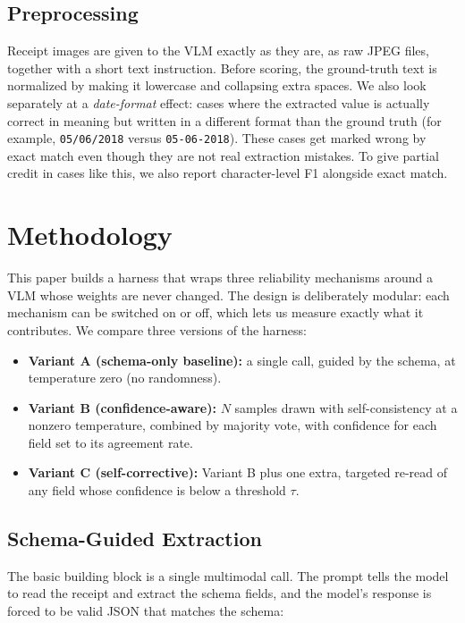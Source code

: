 \documentclass[conference]{IEEEtran}
\begin{document}
\subsection{Preprocessing}
Receipt images are given to the VLM exactly as they are, as raw JPEG files, together with a short text instruction. Before scoring, the ground-truth text is normalized by making it lowercase and collapsing extra spaces. We also look separately at a \emph{date-format} effect: cases where the extracted value is actually correct in meaning but written in a different format than the ground truth (for example, \texttt{05/06/2018} versus \texttt{05-06-2018}). These cases get marked wrong by exact match even though they are not real extraction mistakes. To give partial credit in cases like this, we also report character-level F1 alongside exact match.

\section{Methodology}
\label{sec:method}

This paper builds a harness that wraps three reliability mechanisms around a VLM whose weights are never changed. The design is deliberately modular: each mechanism can be switched on or off, which lets us measure exactly what it contributes. We compare three versions of the harness:

\begin{itemize}
    \item \textbf{Variant A (schema-only baseline):} a single call, guided by the schema, at temperature zero (no randomness).
    \item \textbf{Variant B (confidence-aware):} \(N\) samples drawn with self-consistency at a nonzero temperature, combined by majority vote, with confidence for each field set to its agreement rate.
    \item \textbf{Variant C (self-corrective):} Variant B plus one extra, targeted re-read of any field whose confidence is below a threshold \(\tau\).
\end{itemize}

\subsection{Schema-Guided Extraction}
The basic building block is a single multimodal call. The prompt tells the model to read the receipt and extract the schema fields, and the model's response is forced to be valid JSON that matches the schema:
\end{document}
